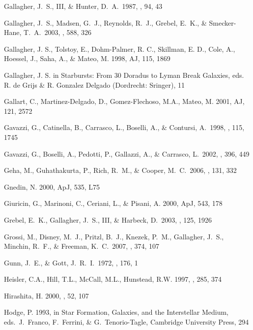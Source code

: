 \documentclass[preprint]{aastex}
\begin{document}
\begin{thebibliography}{}
Gallagher, J.~S., III, \& Hunter, D.~A.\ 1987, \aj, 94, 43 

Gallagher, J.~S., Madsen, G.~J., Reynolds, R.~J., Grebel, E.~K., \& 
    Smecker-Hane, T.~A.\ 2003, \apj, 588, 326 

Gallagher, J. S., Tolstoy, E., Dohm-Palmer, R. C., Skillman, E. D., Cole, A., 
Hoessel, J., Saha, A., \& Mateo, M. 1998, AJ, 115, 1869

Gallagher, J. S. in Starbursts: From 30 Doradus to Lyman Break Galaxies,
eds. R. de Grijs \& R. Gonzalez Delgado (Dordrecht: Sringer), 11


Gallart, C., Martinez-Delgado, D., Gomez-Flechoso, M.A., Mateo, M. 2001, AJ, 121, 2572

Gavazzi, G., Catinella, B., Carrasco, L., Boselli, A., \& Contursi, A.\ 
1998, \aj, 115, 1745 

Gavazzi, G., Boselli, A., Pedotti, P., Gallazzi, A., \& Carrasco, L.\ 
2002, \aap, 396, 449 

Geha, M., Guhathakurta, P., Rich, R.~M., \& Cooper, M.~C.\ 2006, \aj, 131, 332 

\bibitem[Gnedin (2000)]{g00}
Gnedin, N. 2000, ApJ, 535, L75

Giuricin, G., Marinoni, C., Ceriani, L., \& Pisani, A. 2000, ApJ, 543, 178

\bibitem[Grebel et al.(2003)]{ggh03} 
Grebel, E.~K., Gallagher, J.~S., III, \& Harbeck, D.\ 2003, \aj, 125, 1926

\bibitem[Grossi et al.(2007)]{g07} 
Grossi, M., Disney, M.~J., Pritzl, B.~J., Knezek, P.~M., Gallagher, J.~S., 
    Minchin, R.~F., \& Freeman, K.~C.\ 2007, \mnras, 374, 107 

Gunn, J.~E., \& Gott, J.~R.~I.\ 1972, \apj, 176, 1 

Heisler, C.A., Hill, T.L., McCall, M.L., Hunstead, R.W. 1997, \mnras , 285, 374

\bibitem[Hirashita (2000)]{hi00}
Hirashita, H. 2000, \pasj , 52, 107

Hodge, P. 1993, in Star Formation, Galaxies, and the Interstellar Medium,
   eds.\ J.\ Franco, F.\ Ferrini, \& G.\ Tenorio-Tagle, Cambridge University 
   Press, 294


\end{thebibliography}
\end{document}
